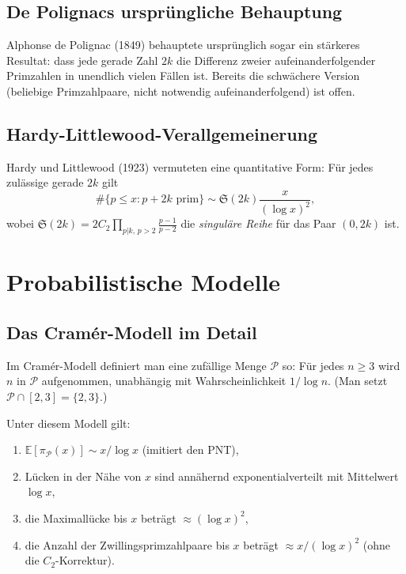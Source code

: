 \documentclass[12pt,a4paper]{amsart}
\theoremstyle{definition}
\begin{document}
\subsection{De Polignacs urspr\"{u}ngliche Behauptung}

Alphonse de Polignac (1849) behauptete urspr\"{u}nglich sogar ein st\"{a}rkeres
Resultat: dass jede gerade Zahl $2k$ die Differenz zweier aufeinanderfolgender
Primzahlen in unendlich vielen F\"{a}llen ist. Bereits die schw\"{a}chere Version
(beliebige Primzahlpaare, nicht notwendig aufeinanderfolgend) ist offen.

\subsection{Hardy-Littlewood-Verallgemeinerung}

Hardy und Littlewood (1923) vermuteten eine quantitative Form: F\"{u}r jedes
zul\"{a}ssige gerade $2k$ gilt
\[
  \#\{p \leq x : p + 2k \text{ prim}\} \sim \mathfrak{S}(2k) \frac{x}{(\log x)^2},
\]
wobei $\mathfrak{S}(2k) = 2C_2 \prod_{p | k,\, p > 2} \frac{p-1}{p-2}$ die
\emph{singul\"{a}re Reihe} f\"{u}r das Paar $(0, 2k)$ ist.

\section{Probabilistische Modelle}

\subsection{Das Cram\'{e}r-Modell im Detail}

Im Cram\'{e}r-Modell definiert man eine zuf\"{a}llige Menge $\mathcal{P}$ so: F\"{u}r
jedes $n \geq 3$ wird $n$ in $\mathcal{P}$ aufgenommen, unabh\"{a}ngig mit
Wahrscheinlichkeit $1/\log n$. (Man setzt $\mathcal{P} \cap [2,3] = \{2,3\}$.)

Unter diesem Modell gilt:
\begin{enumerate}[label=(\roman*)]
  \item $\mathbb{E}[\pi_{\mathcal{P}}(x)] \sim x/\log x$ (imitiert den PNT),
  \item L\"{u}cken in der N\"{a}he von $x$ sind ann\"{a}hernd exponentialverteilt mit
        Mittelwert $\log x$,
  \item die Maximall\"{u}cke bis $x$ betr\"{a}gt $\approx (\log x)^2$,
  \item die Anzahl der Zwillingsprimzahlpaare bis $x$ betr\"{a}gt
        $\approx x/(\log x)^2$ (ohne die $C_2$-Korrektur).
\end{enumerate}
\end{document}
